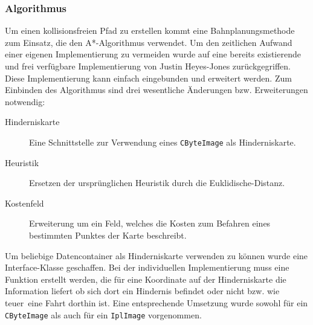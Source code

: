 \subsubsection{Algorithmus}
\authorsection{\editorjulian}
Um einen kollisionsfreien Pfad zu erstellen kommt eine Bahnplanungsmethode zum Einsatz, die den A*-Algorithmus verwendet.
Um den zeitlichen Aufwand einer eigenen Implementierung zu vermeiden wurde auf eine bereits existierende und frei verfügbare Implementierung von Justin Heyes-Jones\cite{jonesAstar} zurückgegriffen.
Diese Implementierung kann einfach eingebunden und erweitert werden.
Zum Einbinden des Algorithmus sind drei wesentliche Änderungen bzw.
Erweiterungen notwendig:
\begin{description}
	\item[Hinderniskarte] Eine Schnittstelle zur Verwendung eines \lstinline{CByteImage} als Hinderniskarte.
	\item[Heuristik] Ersetzen der ursprünglichen Heuristik durch die \gls{Euklidische-Distanz}.
	\item[Kostenfeld] Erweiterung um ein Feld, welches die Kosten zum Befahren eines bestimmten Punktes der Karte beschreibt.
\end{description}

Um beliebige Datencontainer als Hinderniskarte verwenden zu können wurde eine Interface-Klasse geschaffen.
Bei der individuellen Implementierung muss eine Funktion erstellt werden, die für eine Koordinate auf der Hinderniskarte die Information liefert ob sich dort ein Hindernis befindet oder nicht bzw.
wie \glqq teuer\grqq\ eine Fahrt dorthin ist.
Eine entsprechende Umsetzung wurde sowohl für ein \lstinline{CByteImage} als auch für ein \lstinline{IplImage} vorgenommen.

